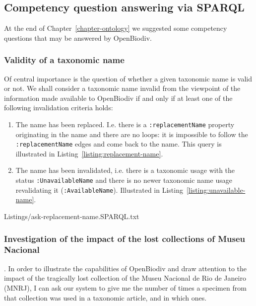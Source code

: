 \subsection{Competency question answering via SPARQL}

At the end of Chapter~\ref{chapter-ontology} we suggested some competency questions that may be answered by OpenBiodiv.

\subsubsection{Validity of a taxonomic name}

Of central importance is the question of whether a given taxonomic name is valid or not. We shall consider a taxonomic name invalid from the viewpoint of the information made available to OpenBiodiv if and only if at least one of the following invalidation criteria holds:

\begin{enumerate}
\item{The name has been replaced. I.e. there is a {\tt :replacementName} property originating in the name and there are no loops: it is impossible to follow the {\tt :replacementName} edges and come back to the name. This query is illustrated in Listing~\ref{listing:replacement-name}}.
\item{The name has been invalidated, i.e. there is a taxonomic usage with the status {\tt :UnavailableName} and there is no newer taxonomic name usage revalidating it ({\tt :AvailableName}). Illustrated in Listing~\ref{listing:unavailable-name}.}
\end{enumerate}


{Listings/ask-replacement-name.SPARQL.txt}



\subsubsection{Investigation of the impact of the lost collections of Museu Nacional}

. In order to illustrate the capabilities of OpenBiodiv and draw attention to the impact of the tragically lost collection of the Museu Nacional de Rio de Janeiro (MNRJ), I can ask our system to give me the number of times a specimen from that collection was used in a taxonomic article, and in which ones.


